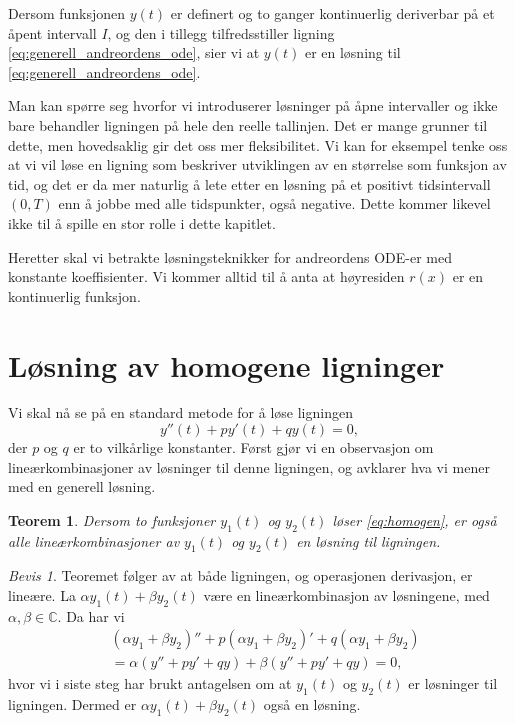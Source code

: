 \documentclass{article}
\newtheorem{thm}{Teorem}\surroundwithmdframed{thm}
\theoremstyle{definition}
\theoremstyle{remark}
\newtheorem*{bevis}{Bevis}
\begin{document}
\begin{multicols*}{2}
Dersom funksjonen $y(t)$ er definert og to ganger kontinuerlig deriverbar på et åpent intervall $I$, og den i tillegg tilfredsstiller ligning \eqref{eq:generell_andreordens_ode}, sier vi at $y(t)$ er en løsning til \eqref{eq:generell_andreordens_ode}.

Man kan spørre seg hvorfor vi introduserer løsninger på åpne intervaller og ikke bare behandler ligningen på hele den reelle tallinjen. Det er mange grunner til dette, men hovedsaklig gir det oss mer fleksibilitet. Vi kan for eksempel tenke oss at vi vil løse en ligning som beskriver utviklingen av en størrelse som funksjon av tid, og det er da mer naturlig å lete etter en løsning på et positivt tidsintervall $(0, T)$ enn å jobbe med alle tidspunkter, også negative. Dette kommer likevel ikke til å spille en stor rolle i dette kapitlet.

Heretter skal vi betrakte løsningsteknikker for andreordens ODE-er med konstante koeffisienter. Vi kommer alltid til å anta at høyresiden $r(x)$ er en kontinuerlig funksjon.


\section*{Løsning av homogene ligninger}

Vi skal nå se på en standard metode for å løse ligningen
\begin{equation} \label{eq:homogen}
    y''(t) + p y'(t) + q y(t) = 0,
\end{equation}
der $p$ og $q$ er to vilkårlige konstanter. Først gjør vi en observasjon om lineærkombinasjoner av løsninger til denne ligningen, og avklarer hva vi mener med en generell løsning.

\begin{thm} \label{thm:lin_komb_losning}
  Dersom to funksjoner $y_1(t)$ og $y_2(t)$ løser \eqref{eq:homogen}, er også alle lineærkombinasjoner av $y_1(t)$ og $y_2(t)$ en løsning til ligningen.
\end{thm}

\begin{bevis}
  Teoremet følger av at både ligningen, og operasjonen derivasjon, er lineære. La $\alpha y_1(t) + \beta y_2(t)$ være en lineærkombinasjon av løsningene, med $\alpha, \beta \in \mathbb{C}$. Da har vi
  \begin{equation*}
    \begin{split}
      & (\alpha y_1 + \beta y_2)'' + p (\alpha y_1 + \beta y_2)' + q (\alpha y_1 + \beta y_2) \\
      & = \alpha (y'' + p y' + q y) + \beta (y'' + p y' + q y) = 0,
    \end{split}
  \end{equation*}
  hvor vi i siste steg har brukt antagelsen om at $y_1(t)$ og $y_2(t)$ er løsninger til ligningen. Dermed er $\alpha y_1(t) + \beta y_2(t)$ også en løsning.
\end{bevis}


\end{multicols*}
\end{document}
